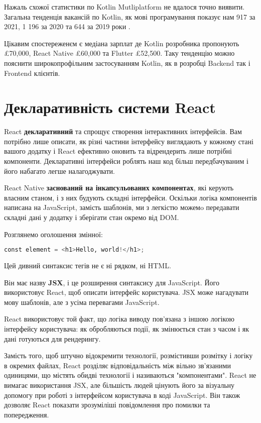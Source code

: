 Нажаль схожої статистики по Kotlin Mutliplatform не вдалося точно виявити.
Загальна тенденція вакансій по Kotlin, як мові програмування показує нам 917 за 2021, 1 196 за 2020 та 644 за 2019 роки \cite{kotlin_jobs}.

Цікавим спостереженєм є медіана зарплат де Kotlin розробника пропонують £70,000\cite{kotlin_jobs}, React Native £60,000\cite{react_native_jobs} та Flutter £52,500\cite{flutter_jobs}.
Таку тенденцію можно пояснити широкопрофільним застосуванням Kotlin, як в розробці Backend так і Frontend клієнтів.


\section{Декларативність системи React}
\label{sec:rn_declarative}

React \textbf{декларативний} та спрощує створення інтерактивних інтерфейсів.
Вам потрібно лише описати, як різні частини інтерфейсу виглядають у кожному стані вашого додатку і React ефективно оновить та відрендерить лише потрібні компоненти.
Декларативні інтерфейси роблять наш код більш передбачуваним і його набагато легше налагоджувати.

React Native \textbf{заснований на інкапсульованих компонентах}, які керують власним станом, і з них будують складні інтерфейси.
Оскільки логіка компонентів написана на JavaScript, замість шаблонів, ми з легкістю можемo передавати складні дані у додатку і зберігати стан окремо від DOM.

Розглянемо оголошення змінної:
\begin{lstlisting}[style=light, language=Python,label={lst:jsx_hello},caption=JSX Hello World]
const element = <h1>Hello, world!</h1>;
\end{lstlisting}

Цей дивний синтаксис тегів не є ні рядком, ні HTML.

Він має назву \textbf{JSX}, і це розширення синтаксису для JavaScript.
Його використовує React, щоб описати інтерфейс користувача.
JSX може нагадувати мову шаблонів, але з усіма перевагами JavaScript.

React використовує той факт, що логіка виводу пов’язана з іншою логікою інтерфейсу користувача: як обробляються події, як змінюється стан з часом і як дані готуються для рендерингу.

Замість того, щоб штучно відокремити технології, розмістивши розмітку і логіку в окремих файлах, React розділяє відповідальність між вільно зв’язаними одиницями, що містять обидві технології і називаються "компонентами".
React не вимагає використання JSX, але більшість людей цінують його за візуальну допомогу при роботі з інтерфейсом користувача в коді JavaScript.
Він також дозволяє React показати зрозуміліші повідомлення про помилки та попередження.


